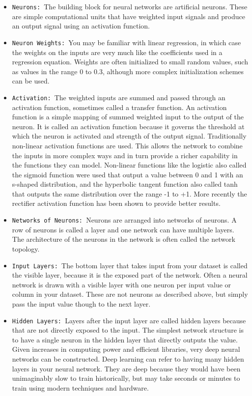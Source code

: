 \documentclass[12pt]{article}
\begin{document}
\begin{itemize}
\item
\texttt{Neurons: }The building block for neural networks are artificial neurons. These are simple computational units that have weighted input signals and produce an output signal using an activation function.

\item
\texttt{Neuron Weights: }You may be familiar with linear regression, in which case the weights on the inputs are very much like the coefficients used in a regression equation. Weights are often initialized to small random values, such as values in the range 0 to 0.3, although more complex initialization schemes can be used.

\item
\texttt{Activation: }The weighted inputs are summed and passed through an activation function, sometimes called a transfer function. An activation function is a simple mapping of summed weighted input to the output of the neuron. It is called an activation function because it governs the threshold at which the neuron is activated and strength of the output signal. Traditionally non-linear activation functions are used. This allows the network to combine the inputs in more complex ways and in turn provide a richer capability in the functions they can model. Non-linear functions like the logistic also called the sigmoid function were used that output a value between 0 and 1 with an s-shaped distribution, and the hyperbolic tangent function also called tanh that outputs the same distribution over the range -1 to +1. More recently the rectifier activation function has been shown to provide better results.

\item
\texttt{Networks of Neurons: }Neurons are arranged into networks of neurons. A row of neurons is called a layer and one network can have multiple layers. The architecture of the neurons in the network is often called the network topology.

\item
\texttt{Input Layers: }The bottom layer that takes input from your dataset is called the visible layer, because it is the exposed part of the network. Often a neural network is drawn with a visible layer with one neuron per input value or column in your dataset. These are not neurons as described above, but simply pass the input value though to the next layer.

\item
\texttt{Hidden Layers: }Layers after the input layer are called hidden layers because that are not directly exposed to the input. The simplest network structure is to have a single neuron in the hidden layer that directly outputs the value. Given increases in computing power and efficient libraries, very deep neural networks can be constructed. Deep learning can refer to having many hidden layers in your neural network. They are deep because they would have been unimaginably slow to train historically, but may take seconds or minutes to train using modern techniques and hardware.


\end{itemize}
\end{document}
